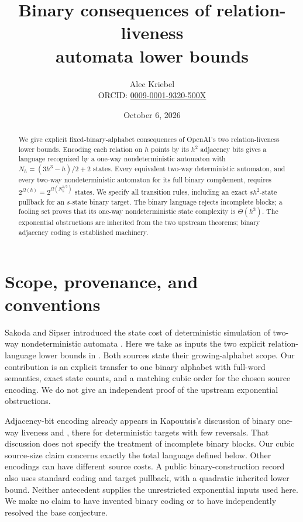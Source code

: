\documentclass[11pt]{article}
\title{Binary consequences of relation-liveness\protect\\ automata lower bounds}
\author{Alec Kriebel\protect\\\small ORCID: \href{https://orcid.org/0009-0001-9320-500X}{0009-0001-9320-500X}}
\date{October 6, 2026}
\begin{document}
\maketitle
\begin{abstract}
We give explicit fixed-binary-alphabet consequences of OpenAI's two
relation-liveness lower bounds. Encoding each relation on $h$ points by its
$h^2$ adjacency bits gives a language recognized by a one-way nondeterministic
automaton with $N_h=(3h^3-h)/2+2$ states. Every equivalent two-way
deterministic automaton, and every two-way nondeterministic automaton for its
full binary complement, requires $2^{\Omega(h)}=2^{\Omega(N_h^{1/3})}$
states. We specify all transition rules, including an exact $sh^2$-state
pullback for an $s$-state binary target. The binary language rejects incomplete
blocks; a fooling set proves that its one-way nondeterministic state complexity
is $\Theta(h^3)$. The exponential obstructions are inherited from the two
upstream theorems; binary adjacency coding is established machinery.
\end{abstract}

\section{Scope, provenance, and conventions}
Sakoda and Sipser introduced the state cost of deterministic simulation of
two-way nondeterministic automata \cite{SakodaSipser1978}. Here we take as
inputs the two explicit relation-language lower bounds in
\cite{OAI:An-exponential-two-way-deterministic-state-lower-bound-for-one-way-liveness-September-25-2026,OAI:An-exponential-state-lower-bound-for-two-way-nondeterministic-complementation-September-25-2026}.
Both sources state their growing-alphabet scope. Our contribution is an
explicit transfer to one binary alphabet with full-word semantics, exact
state counts, and a matching cubic order for the chosen source encoding.
We do not give an independent proof of the upstream exponential obstructions.

Adjacency-bit encoding already appears in Kapoutsis's discussion of binary
one-way liveness \cite[Section~5]{Kapoutsis2011} and
\cite[Section~8]{Kapoutsis2013}, there for deterministic
targets with few reversals. That discussion does not specify the treatment
of incomplete binary blocks. Our cubic source-size claim concerns exactly
the total language defined below. Other encodings can have different source
costs. A public binary-construction record \cite{TheoremDBR816} also uses
standard coding and target pullback, with a quadratic inherited lower bound.
Neither antecedent supplies the unrestricted exponential inputs used here.
We make no claim to have invented binary coding or to have independently
resolved the base conjecture.
\end{document}
